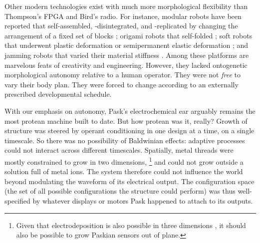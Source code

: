 Other modern technologies exist with much more 
morphological
flexibility
than Thompson's FPGA and Bird's radio.
For instance,
modular robots have been reported that self-assembled, -disintegrated, and -replicated by changing the arrangement of a fixed set of blocks \cite{zykov2005robotics,romanishin20153d,li2019particle,white2005three};
origami robots that self-folded
\cite{hawkes2010programmable,felton2014method,miyashita2017robotic,gladman2016biomimetic,kotikian2019untethered};
soft robots that underwent plastic deformation or semipermanent elastic deformation
\cite{shepherd2011multigait,shah2019morphing,shah2020gaining};
and jamming robots that varied their material stiffness \cite{brown2010universal,narang2018transforming,steltz2009jsel}.
Among these platforms are marvelous feats of creativity and engineering.
However, they lacked ontogenetic morphological autonomy relative to a human operator.
They were not \textit{free} to vary their body plan.
They were forced to change according to an externally prescribed developmental schedule.




With our emphasis on autonomy,
Pask's electrochemical ear 
arguably remains the most protean machine built to date.
But how protean was it, really?
Growth of structure was steered by operant conditioning in one design at a time, on a single timescale.
So there was no possibility of Baldwinian effects: adaptive processes could not interact across different timescales.
Spatially,
metal threads were mostly constrained to grow 
in two dimensions,%
\footnote{%
Given that electrodeposition is also possible in three dimensions \cite{madden1995fabrication}, it should also be possible to grow Paskian sensors out of plane.
}
and could not grow outside a solution full of metal ions.
The system therefore could not influence the world beyond modulating the waveform of its electrical output.
The 
configuration space
(the set of all possible 
configurations
the structure could perform)
was thus well-specified by whatever displays or motors Pask happened to attach to its outputs.

